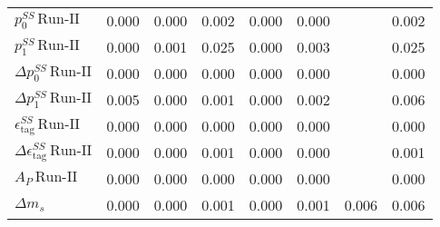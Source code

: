 \begin{tabular}{l  c  c  c  c  c  c  | c }
$p_{0}^{SS} \, \text{Run-II}$ & 0.000 & 0.000 & 0.002 & 0.000 & 0.000 &  & 0.002 \\ 
$p_{1}^{SS} \, \text{Run-II}$ & 0.000 & 0.001 & 0.025 & 0.000 & 0.003 &  & 0.025 \\ 
$\Delta p_{0}^{SS} \, \text{Run-II}$ & 0.000 & 0.000 & 0.000 & 0.000 & 0.000 &  & 0.000 \\ 
$\Delta p_{1}^{SS} \, \text{Run-II}$ & 0.005 & 0.000 & 0.001 & 0.000 & 0.002 &  & 0.006 \\ 
$\epsilon_{\text{tag}}^{SS} \, \text{Run-II}$ & 0.000 & 0.000 & 0.000 & 0.000 & 0.000 &  & 0.000 \\ 
$\Delta \epsilon_{\text{tag}}^{SS} \, \text{Run-II}$ & 0.000 & 0.000 & 0.001 & 0.000 & 0.000 &  & 0.001 \\ 
$A_{P} \, \text{Run-II}$ & 0.000 & 0.000 & 0.000 & 0.000 & 0.000 &  & 0.000 \\ 
$\Delta m_{s}$ & 0.000 & 0.000 & 0.001 & 0.000 & 0.001 & 0.006 & 0.006 \\ 
\hline
\hline
\end{tabular}
